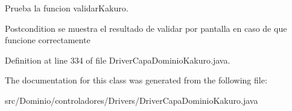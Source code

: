 Prueba la funcion validar\+Kakuro. 

\begin{DoxyPostcond}{Postcondition}
se muestra el resultado de validar por pantalla en caso de que funcione correctamente 
\end{DoxyPostcond}


Definition at line 334 of file Driver\+Capa\+Dominio\+Kakuro.\+java.



The documentation for this class was generated from the following file\+:\begin{DoxyCompactItemize}
\item 
src/\+Dominio/controladores/\+Drivers/Driver\+Capa\+Dominio\+Kakuro.\+java\end{DoxyCompactItemize}
